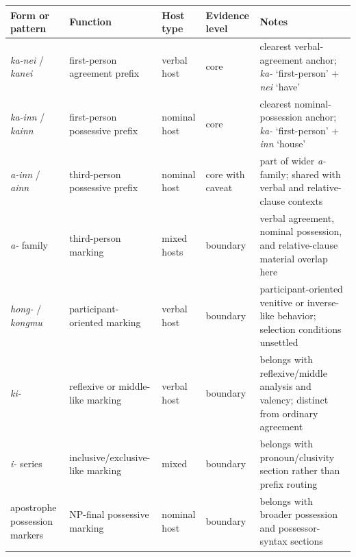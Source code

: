 \documentclass[
  11pt,
  a4paper,
]{article}
\newcounter{none} %
\newcommand{\tdim}[1]{\textit{#1}}
\newcommand{\glossquote}[1]{`#1'}
\begin{document}
{\def\LTcaptype{none} %
\begin{longtable}[]{@{}
  >{\raggedright\arraybackslash}p{}
  >{\raggedright\arraybackslash}p{}
  >{\raggedright\arraybackslash}p{}
  >{\raggedright\arraybackslash}p{}
  >{\raggedright\arraybackslash}p{}@{}}
\toprule\noalign{}
\begin{minipage}[b]{\linewidth}\raggedright
Form or pattern
\end{minipage} & \begin{minipage}[b]{\linewidth}\raggedright
Function
\end{minipage} & \begin{minipage}[b]{\linewidth}\raggedright
Host type
\end{minipage} & \begin{minipage}[b]{\linewidth}\raggedright
Evidence level
\end{minipage} & \begin{minipage}[b]{\linewidth}\raggedright
Notes
\end{minipage} \\
\midrule\noalign{}
\endhead
\bottomrule\noalign{}
\endlastfoot
\tdim{ka-nei} / \tdim{kanei} & first-person agreement prefix & verbal
host & core & clearest verbal-agreement anchor; \tdim{ka-}
\glossquote{first-person} + \tdim{nei} \glossquote{have} \\
\tdim{ka-inn} / \tdim{kainn} & first-person possessive prefix & nominal
host & core & clearest nominal-possession anchor; \tdim{ka-}
\glossquote{first-person} + \tdim{inn} \glossquote{house} \\
\tdim{a-inn} / \tdim{ainn} & third-person possessive prefix & nominal
host & core with caveat & part of wider \tdim{a-} family; shared with
verbal and relative-clause contexts \\
\tdim{a-} family & third-person marking & mixed hosts & boundary &
verbal agreement, nominal possession, and relative-clause material
overlap here \\
\tdim{hong-} / \tdim{kongmu} & participant-oriented marking & verbal
host & boundary & participant-oriented venitive or inverse-like
behavior; selection conditions unsettled \\
\tdim{ki-} & reflexive or middle-like marking & verbal host & boundary &
belongs with reflexive/middle analysis and valency; distinct from
ordinary agreement \\
\tdim{i-} series & inclusive/exclusive-like marking & mixed & boundary &
belongs with pronoun/clusivity section rather than prefix routing \\
apostrophe possession markers & NP-final possessive marking & nominal
host & boundary & belongs with broader possession and possessor-syntax
sections \\
\end{longtable}
}
\end{document}
